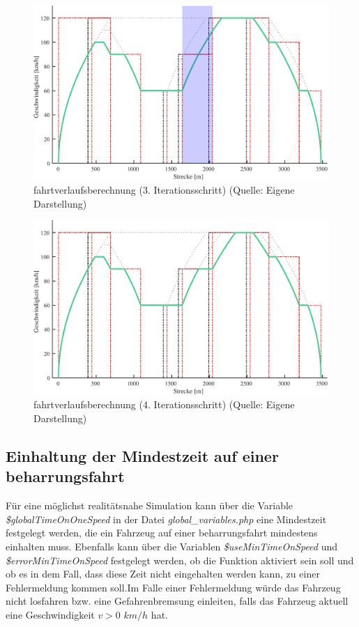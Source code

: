 \begin{figure}
\includegraphics[width=\linewidth]{../images/matlab/it5.pdf}
\caption[\Gls{fahrtverlauf}sberechnung (3. Iterationsschritt)]{\Gls{fahrtverlauf}sberechnung (3. Iterationsschritt) (Quelle: Eigene Darstellung)}
\label{fig:it5}
\end{figure}
\begin{figure}
\includegraphics[width=\linewidth]{../images/matlab/it6.pdf}
\caption[\Gls{fahrtverlauf}sberechnung (4. Iterationsschritt)]{\Gls{fahrtverlauf}sberechnung (4. Iterationsschritt) (Quelle: Eigene Darstellung)}
\label{fig:it6}
\end{figure}
\subsection{Einhaltung der Mindestzeit auf einer \Gls{beharrungsfahrt}} \label{minTime}
Für eine möglichst realitätsnahe Simulation kann über die Variable \textit{\$global\-Time\-On\-One\-Speed} in der Datei \textit{global\_variables.php} eine Mindestzeit festgelegt werden, die ein Fahrzeug auf einer \Gls{beharrungsfahrt} mindestens einhalten muss. Ebenfalls kann über die Variablen \textit{\$useMinTimeOnSpeed} und \textit{\$errorMinTimeOnSpeed} festgelegt werden, ob die Funktion aktiviert sein soll und ob es in dem Fall, dass diese Zeit nicht eingehalten werden kann, zu einer Fehlermeldung kommen soll.\newpage Im Falle einer Fehlermeldung würde das Fahrzeug nicht losfahren bzw. eine Gefahrenbremsung einleiten, falls das Fahrzeug aktuell eine Geschwindigkeit $v > 0$ $km/h$ hat. 

